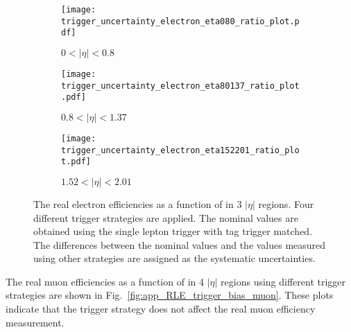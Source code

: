 \begin{figure}[htbp]
    \begin{subfigure}[b]{0.32\textwidth}
        \begin{center}
            \texttt{[image: trigger\_uncertainty\_electron\_eta080\_ratio\_plot.pdf]}
            \caption{$0 < |\eta| < 0.8$}
        \end{center}
    \end{subfigure}
    \begin{subfigure}[b]{0.32\textwidth}
        \begin{center}
            \texttt{[image: trigger\_uncertainty\_electron\_eta80137\_ratio\_plot.pdf]}
            \caption{$0.8 < |\eta| < 1.37$}
        \end{center}
    \end{subfigure}
    \begin{subfigure}[b]{0.32\textwidth}
        \begin{center}
            \texttt{[image: trigger\_uncertainty\_electron\_eta152201\_ratio\_plot.pdf]}
            \caption{$1.52 < |\eta| < 2.01$}
        \end{center}
    \end{subfigure}
    \caption{The real electron efficiencies as a function of \pt in 3 $|\eta|$ regions.
    Four different trigger strategies are applied.
    The nominal values are obtained using the single lepton trigger with tag trigger matched.
    The differences between the nominal values and the values measured using other strategies are assigned as the systematic uncertainties.}
    \label{fig:app_RLE_trigger_bias_electron}
\end{figure}

The real muon efficiencies as a function of \pt in 4 $|\eta|$ regions using different trigger strategies are shown in Fig.~\ref{fig:app_RLE_trigger_bias_muon}.
These plots indicate that the trigger strategy does not affect the real muon efficiency measurement.

